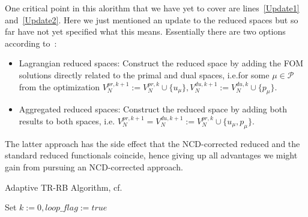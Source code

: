 One critical point in this alorithm that we have yet to cover are lines~\ref{Update1} and~\ref{Update2}.
Here we just mentioned an update to the reduced spaces but so far have not yet specified what this means.
Essentially there are two options according to~\cite{Keil2021}:
\begin{itemize}
    \item Lagrangian reduced spaces: Construct the reduced space by adding the FOM solutions directly related to the primal and dual spaces, i.e.\@ for some $\mu \in \mathcal{P}$ from the optimization $V_N^{pr, k + 1} := V_N^{pr, k} \cup \{ u_\mu \}, V_N^{du, k + 1} := V_N^{du, k} \cup \{ p_\mu \}$.
    \item Aggregated reduced spaces: Construct the reduced space by adding both results to both spaces, i.e. $V_N^{pr, k + 1} = V_N^{du, k + 1} := V_N^{pr, k} \cup \{ u_\mu, p_\mu \}$.
\end{itemize}
The latter approach has the side effect that the NCD-corrected reduced and the standard reduced functionals coincide, hence giving up all advantages we might gain from pursuing an NCD-corrected approach.

\begin{algorithm}[H]\label{alg:AdaptTRRB}
    \caption{Adaptive TR-RB Algorithm, cf.~\cite[Algorithm 1]{Keil2021}}
    Set $k := 0, loop\_flag := true$\;
\end{algorithm}

